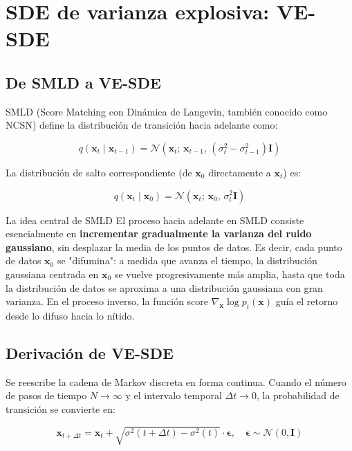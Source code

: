 \section{SDE de varianza explosiva: VE-SDE}

\subsection{De SMLD a VE-SDE}

SMLD (Score Matching con Dinámica de Langevin, también conocido como NCSN) define la distribución de transición hacia adelante como:

$$
q(\mathbf{x}_t \mid \mathbf{x}_{t-1}) = \mathcal{N}\!\left(\mathbf{x}_t;\, \mathbf{x}_{t-1},\, (\sigma_t^2 - \sigma_{t-1}^2)\mathbf{I}\right)
$$

La distribución de salto correspondiente (de $\mathbf{x}_0$ directamente a $\mathbf{x}_t$) es:

$$
q(\mathbf{x}_t \mid \mathbf{x}_0) = \mathcal{N}\!\left(\mathbf{x}_t;\, \mathbf{x}_0,\, \sigma_t^2 \mathbf{I}\right)
$$

\begin{importantbox}{La idea central de SMLD}
El proceso hacia adelante en SMLD consiste esencialmente en \textbf{incrementar gradualmente la varianza del ruido gaussiano}, sin desplazar la media de los puntos de datos. Es decir, cada punto de datos $\mathbf{x}_0$ se "difumina": a medida que avanza el tiempo, la distribución gaussiana centrada en $\mathbf{x}_0$ se vuelve progresivamente más amplia, hasta que toda la distribución de datos se aproxima a una distribución gaussiana con gran varianza. En el proceso inverso, la función score $\nabla_{\mathbf{x}} \log p_t(\mathbf{x})$ guía el retorno desde lo difuso hacia lo nítido.
\end{importantbox}

\subsection{Derivación de VE-SDE}

Se reescribe la cadena de Markov discreta en forma continua. Cuando el número de pasos de tiempo $N \to \infty$ y el intervalo temporal $\Delta t \to 0$, la probabilidad de transición se convierte en:

$$
\mathbf{x}_{t+\Delta t} = \mathbf{x}_t + \sqrt{\sigma^2(t+\Delta t) - \sigma^2(t)} \cdot \boldsymbol{\epsilon}, \quad \boldsymbol{\epsilon} \sim \mathcal{N}(0, \mathbf{I})
$$


